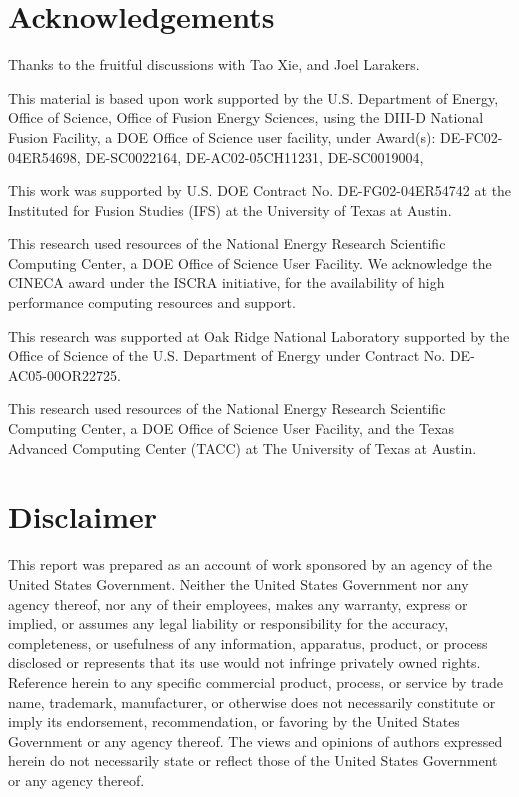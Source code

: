 \documentclass[
 aip,
 amsmath,amssymb,
 reprint
]{revtex4-1}
\begin{document}
\section{Acknowledgements}
Thanks to the fruitful discussions with Tao Xie, and Joel Larakers. 

This material is based upon work supported by the U.S. Department of Energy, Office of Science, Office of Fusion Energy Sciences, using the DIII-D National Fusion Facility, a DOE Office of Science user facility, under Award(s): 
DE-FC02-04ER54698, 
DE-SC0022164,  
DE-AC02-05CH11231, 
DE-SC0019004, 


This work was supported by U.S. DOE Contract No. DE-FG02-04ER54742 at the Instituted for Fusion Studies (IFS) at the University of Texas at Austin.

This research used resources of the National Energy Research Scientific Computing Center, a DOE Office of Science User Facility. We acknowledge the CINECA award under the ISCRA initiative, for the availability of high performance computing resources and support.

This research was supported at Oak Ridge National Laboratory supported by the Office of Science of the U.S. Department of Energy under Contract No. DE-AC05-00OR22725.

This research used resources of the National Energy Research Scientific Computing Center, a DOE Office of Science User Facility, and the Texas Advanced Computing Center (TACC) at The University of Texas at Austin.

\section{Disclaimer}
This report was prepared as an account of work sponsored by an agency of the United States Government. Neither the United States Government nor any agency thereof, nor any of their employees, makes any warranty, express or implied, or assumes any legal liability or responsibility for the accuracy, completeness, or usefulness of any information, apparatus, product, or process disclosed or represents that its use would not infringe privately owned rights. Reference herein to any specific commercial product, process, or service by trade name, trademark, manufacturer, or otherwise does not necessarily constitute or imply its endorsement, recommendation, or favoring by the United States Government or any agency thereof. The views and opinions of authors expressed herein do not necessarily state or reflect those of the United States Government or any agency thereof.
\end{document}
